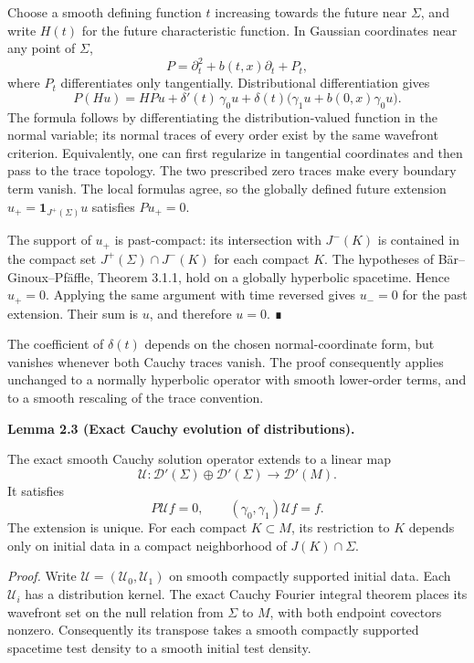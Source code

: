 \documentclass[
  english,
  11pt,
  reqno]{amsart}
\makeatletter
\newcommand{\pandocstatementheading}[1]{%
  \par\addpenalty{\@beginparpenalty}%
  \addvspace{.5\baselineskip plus .2\baselineskip minus .2\baselineskip}%
  {\normalfont\bfseries #1\par}%
  \nobreak\@afterindenttrue\@afterheading
}
\makeatother
\begin{document}
Choose a smooth defining function \(t\) increasing towards the future
near \(\Sigma\), and write \(H(t)\) for the future characteristic
function. In Gaussian coordinates near any point of \(\Sigma\), \[
P=\partial_t^2+b(t,x)\partial_t+P_t,
\] where \(P_t\) differentiates only tangentially. Distributional
differentiation gives \[
P(Hu)
=H Pu+\delta'(t)\,\gamma_0u
+\delta(t)\bigl(\gamma_1u+b(0,x)\gamma_0u\bigr).
\] The formula follows by differentiating the distribution-valued
function in the normal variable; its normal traces of every order exist
by the same wavefront criterion. Equivalently, one can first regularize
in tangential coordinates and then pass to the trace topology. The two
prescribed zero traces make every boundary term vanish. The local
formulas agree, so the globally defined future extension
\(u_+=\mathbf1_{J^+(\Sigma)}u\) satisfies \(Pu_+=0\).

The support of \(u_+\) is past-compact: its intersection with \(J^-(K)\)
is contained in the compact set \(J^+(\Sigma)\cap J^-(K)\) for each
compact \(K\). The hypotheses of Bär--Ginoux--Pfäffle, Theorem 3.1.1,
hold on a globally hyperbolic spacetime. Hence \(u_+=0\). Applying the
same argument with time reversed gives \(u_-=0\) for the past extension.
Their sum is \(u\), and therefore \(u=0\). ∎

The coefficient of \(\delta(t)\) depends on the chosen normal-coordinate
form, but vanishes whenever both Cauchy traces vanish. The proof
consequently applies unchanged to a normally hyperbolic operator with
smooth lower-order terms, and to a smooth rescaling of the trace
convention.

\pandocstatementheading{\protect{}\label{lem:distributional-cauchy-evolution}Lemma 2.3 (Exact Cauchy evolution of distributions).}

The exact smooth Cauchy solution operator extends to a linear map \[
\mathcal U:\mathcal D'(\Sigma)\oplus\mathcal D'(\Sigma)
\longrightarrow\mathcal D'(M).
\] It satisfies \[
P\mathcal U f=0,\qquad
(\gamma_0,\gamma_1)\mathcal U f=f.
\] The extension is unique. For each compact \(K\subset M\), its
restriction to \(K\) depends only on initial data in a compact
neighborhood of \(J(K)\cap\Sigma\).

\emph{Proof.} Write \(\mathcal U=(\mathcal U_0,\mathcal U_1)\) on smooth
compactly supported initial data. Each \(\mathcal U_i\) has a
distribution kernel. The exact Cauchy Fourier integral theorem places
its wavefront set on the null relation from \(\Sigma\) to \(M\), with
both endpoint covectors nonzero. Consequently its transpose takes a
smooth compactly supported spacetime test density to a smooth initial
test density.
\end{document}
